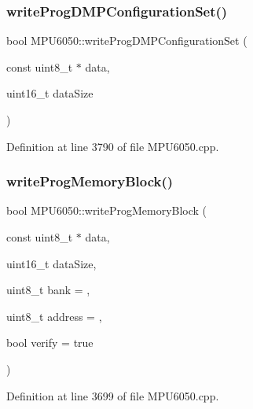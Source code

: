 \subsubsection{\texorpdfstring{writeProgDMPConfigurationSet()}{writeProgDMPConfigurationSet()}}
{\footnotesize\ttfamily bool M\+P\+U6050\+::write\+Prog\+D\+M\+P\+Configuration\+Set (\begin{DoxyParamCaption}\item[{const uint8\+\_\+t $\ast$}]{data,  }\item[{uint16\+\_\+t}]{data\+Size }\end{DoxyParamCaption})}



Definition at line 3790 of file M\+P\+U6050.\+cpp.


\begin{DoxyCode}{0}

\end{DoxyCode}
\mbox{\label{classMPU6050_a201dc0aa819f451584c575c5a7590e10}} 
\subsubsection{\texorpdfstring{writeProgMemoryBlock()}{writeProgMemoryBlock()}}
{\footnotesize\ttfamily bool M\+P\+U6050\+::write\+Prog\+Memory\+Block (\begin{DoxyParamCaption}\item[{const uint8\+\_\+t $\ast$}]{data,  }\item[{uint16\+\_\+t}]{data\+Size,  }\item[{uint8\+\_\+t}]{bank = {},  }\item[{uint8\+\_\+t}]{address = {},  }\item[{bool}]{verify = {\ttfamily true} }\end{DoxyParamCaption})}



Definition at line 3699 of file M\+P\+U6050.\+cpp.


\begin{DoxyCode}{0}

\end{DoxyCode}


